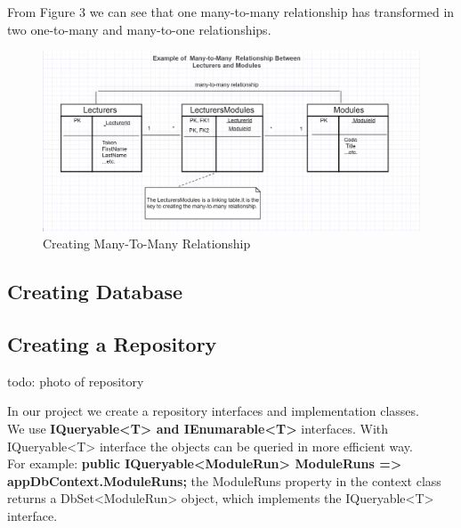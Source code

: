 \documentclass{scrartcl}
\begin{document}
From Figure 3 we can see that one many-to-many relationship has transformed in two one-to-many and many-to-one relationships.

\begin{figure}[H]
\centering
\includegraphics[width=150mm]{report_img/many-to-many-tables.JPG}
\caption{Creating Many-To-Many Relationship}
\label{blabla}
\end{figure}



\subsection{Creating Database}
\newpage
\subsection{Creating a Repository}

todo: photo of repository



In our project we create a repository interfaces and implementation classes.\\
We use \textbf{IQueryable<T> and IEnumarable<T>} interfaces.
With IQueryable<T> interface the objects can be queried in more efficient way.\\
For example: \textbf{public IQueryable<ModuleRun> ModuleRuns => appDbContext.ModuleRuns;} the ModuleRuns property in the context class returns a DbSet<ModuleRun> object, which implements the IQueryable<T> interface.
\end{document}
